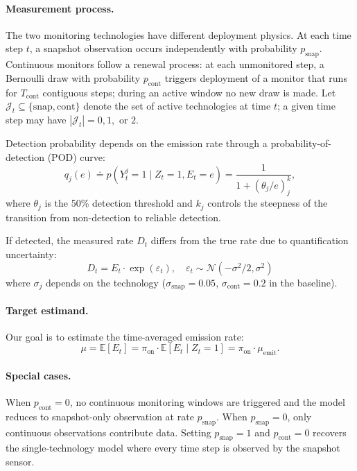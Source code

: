 \documentclass[11pt]{article}
\newcommand{\E}{\mathbb{E}}
\begin{document}
\paragraph{Measurement process.} The two monitoring technologies have different deployment physics. At each time step $t$, a snapshot observation occurs independently with probability $p_{\text{snap}}$. Continuous monitors follow a renewal process: at each unmonitored step, a Bernoulli draw with probability $p_{\text{cont}}$ triggers deployment of a monitor that runs for $T_{\text{cont}}$ contiguous steps; during an active window no new draw is made. Let $\mathcal{J}_t \subseteq \{\text{snap}, \text{cont}\}$ denote the set of active technologies at time $t$; a given time step may have $|\mathcal{J}_t| = 0, 1,$ or $2$.

Detection probability depends on the emission rate through a probability-of-detection (POD) curve:
\begin{equation}
    q_j(e)
    \doteq p(Y^j_t=1\mid Z_t=1,E_t=e) 
    = \frac{1}{1+(\theta_j/e)^k_j},
\end{equation}
where $\theta_j$ is the 50\% detection threshold and $k_j$ controls the steepness of the transition from non-detection to reliable detection.

If detected, the measured rate $D_t$ differs from the true rate due to quantification uncertainty:
\begin{equation}
    D_t = E_t \cdot \exp(\varepsilon_t), \quad \varepsilon_t \sim \mathcal{N}(-\sigma^2/2, \sigma^2)
\end{equation}
where $\sigma_j$ depends on the technology ($\sigma_{\text{snap}} = 0.05$, $\sigma_{\text{cont}} = 0.2$ in the baseline).

\paragraph{Target estimand.} Our goal is to estimate the time-averaged emission rate:
\begin{equation}
    \mu = \E[E_t] = \pi_{\text{on}} \cdot \E[E_t \mid Z_t = 1] = \pi_{\text{on}} \cdot \mu_{\text{emit}}.
\end{equation}

\paragraph{Special cases.}
When $p_{\text{cont}} = 0$, no continuous monitoring windows are triggered and the model reduces to snapshot-only observation at rate $p_{\text{snap}}$. When $p_{\text{snap}} = 0$, only continuous observations contribute data. Setting $p_{\text{snap}} = 1$ and $p_{\text{cont}} = 0$ recovers the single-technology model where every time step is observed by the snapshot sensor.
\end{document}
